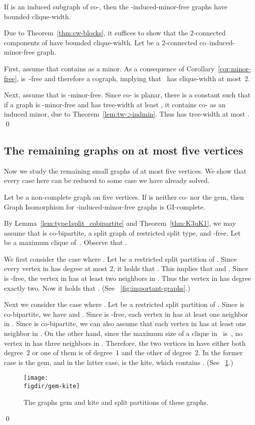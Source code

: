 \documentclass[envcountsame,envcountsect,11pt,a4paper]{llncs}
\renewenvironment{proof}{\begin{Proof}}{\qed\end{Proof}}
\newcommand{\figref}[1]{\figurename~\ref{#1}}
\newcommand{\figdir}{.}
\begin{document}
\begin{theorem}
\label{thm:german-house_cw}
If  is an induced subgraph of co-,
then the -induced-minor-free graphs have bounded clique-width.
\end{theorem}
\begin{proof}
Due to Theorem~\ref{thm:cw-blocks}, it suffices to show that the 2-connected components of  have bounded clique-width.
Let  be a 2-connected co--induced-minor-free graph.

First, assume that  contains  as a minor.
As a consequence of Corollary~\ref{cor:minor-free},  is~-free and therefore a cograph, implying that~ has clique-width at most~2.

Next, assume that  is -minor-free. Since co- is planar, there is a constant  such that if a graph is -minor-free and has tree-width at least , it contains co- as an induced minor, due to  Theorem~\ref{lem:tw->indmin}. Thus  has tree-width at most .
\end{proof}


\subsection{The remaining graphs on at most five vertices}
Now we study the remaining small graphs of at most five vertices.
We show that every case here can be reduced to some case we have already solved.
\begin{lemma}
Let  be a non-complete graph on five vertices.
If  is neither co- 
nor the gem,
then {\sc Graph Isomorphism} for -induced-minor-free graphs is GI-complete.
\end{lemma}
\begin{proof}
By Lemma~\ref{lem:type1split_cobipartite} and Theorem~\ref{thm:K3uK1},
we may assume that  is co-bipartite, a split graph of restricted split type, and -free.
Let~ be a maximum clique of~. Observe that .

We first consider the case where .
Let  be a restricted split partition of .
Since every vertex in  has degree at most 2, it holds that .
This implies that  and .
Since  is -free, the vertex in  has at least two neighbors in .
Thus the vertex in  has degree exactly two.
Now it holds that .
(See \figref{fig:important-graphs}.)

Next we consider the case where .
Let  be a restricted split partition of .
Since  is co-bipartite, we have  and .
Since  is -free, each vertex in  has at least one neighbor in .
Since  is co-bipartite, we can also assume that each vertex in  has at least one neighbor in .
On the other hand, since the maximum size of a clique in~ is~, no vertex in  has three neighbors in .
Therefore, the two vertices in  have either both degree~2 or one of them is of degree~1 and the other of degree~2.
In the former case  is the gem, and in the latter case,  is the kite, which contains .
(See \figref{fig:gem-kite}.)
\begin{figure}[htb]
  \centering
  \texttt{[image: \\figdir/gem-kite]}
  \caption{The graphs gem and kite and split partitions of these graphs.}
  \label{fig:gem-kite}
\end{figure}
\end{proof}
\end{document}
